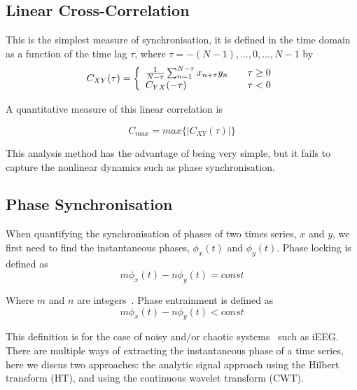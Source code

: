 \documentclass[]{article}
\begin{document}
\subsection{Linear Cross-Correlation}
This is the simplest measure of synchronisation, it is defined in
the time domain as a function of the time lag $\tau$, where $\tau =
-(N-1),...,0,...,N-1$ by
\begin{equation}
C_{XY}(\tau) = \left\{\begin{array}{l l}
  \frac{1}{N-\tau}\sum_{n=1}^{N-\tau}x_{n+\tau}y_n & \quad \tau \geq 0\\
  C_{YX}(-\tau) & \quad \tau <0\\ \end{array} \right.
\end{equation}

A quantitative measure of this linear correlation is

\begin{equation}
C_{max} = max\{|C_{XY}(\tau)|\}
\end{equation}

This analysis method has the advantage of being very simple, but it
fails to capture the nonlinear dynamics such as phase
synchronisation.

\subsection{Phase Synchronisation}

When quantifying the synchronisation of phases of two times series,
$x$ and $y$, we first need to find the instantaneous phases,
$\phi_x(t)$ and $\phi_y(t)$. Phase locking is defined as
\begin{equation}
m\phi_x(t)-n\phi_y(t) = const
\end{equation}

Where $m$ and $n$ are integers~\cite{Huygens1673}. Phase
entrainment is defined as
\begin{equation}
m\phi_x(t)-n\phi_y(t) < const
\end{equation}

This definition is for the case of noisy and/or chaotic
systems~\cite{Rosenblum1996} such as iEEG.\\

There are multiple ways of extracting the instantaneous phase of a
time series, here we discus two approaches: the analytic signal
approach using the Hilbert transform (HT), and using the
continuous wavelet transform (CWT).\\
\end{document}
